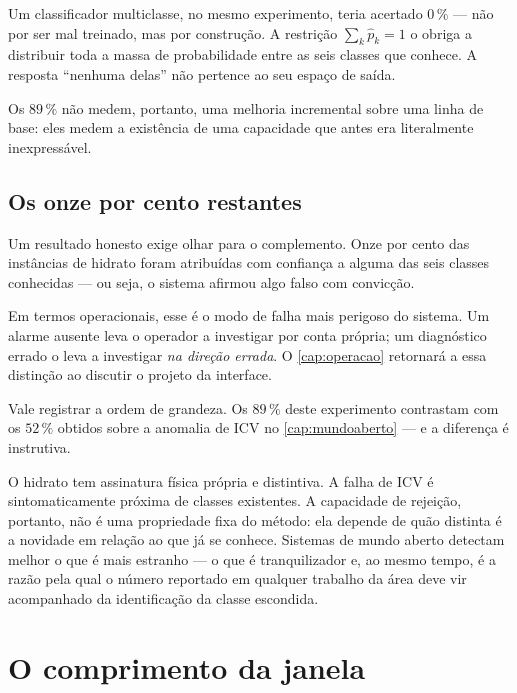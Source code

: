 \begin{destaque}
Um classificador multiclasse, no mesmo experimento, teria acertado $0\,\%$ --- não por
ser mal treinado, mas por construção. A restrição $\sum_k \hat{p}_k = 1$ o obriga a
distribuir toda a massa de probabilidade entre as seis classes que conhece. A resposta
``nenhuma delas'' não pertence ao seu espaço de saída.

Os $89\,\%$ não medem, portanto, uma melhoria incremental sobre uma linha de base: eles
medem a existência de uma capacidade que antes era literalmente inexpressável.
\end{destaque}

\subsection{Os onze por cento restantes}

Um resultado honesto exige olhar para o complemento. Onze por cento das instâncias de
hidrato foram atribuídas com confiança a alguma das seis classes conhecidas --- ou seja,
o sistema afirmou algo falso com convicção.

Em termos operacionais, esse é o modo de falha mais perigoso do sistema. Um alarme
ausente leva o operador a investigar por conta própria; um diagnóstico errado o leva a
investigar \emph{na direção errada}. O \cref{cap:operacao} retornará a essa distinção ao
discutir o projeto da interface.

\begin{destaque}
Vale registrar a ordem de grandeza. Os $89\,\%$ deste experimento contrastam com os
$52\,\%$ obtidos sobre a anomalia de ICV no \cref{cap:mundoaberto} --- e a diferença é
instrutiva.

O hidrato tem assinatura física própria e distintiva. A falha de ICV é sintomaticamente
próxima de classes existentes. A capacidade de rejeição, portanto, não é uma propriedade
fixa do método: ela depende de quão distinta é a novidade em relação ao que já se
conhece. Sistemas de mundo aberto detectam melhor o que é mais estranho --- o que é
tranquilizador e, ao mesmo tempo, é a razão pela qual o número reportado em qualquer
trabalho da área deve vir acompanhado da identificação da classe escondida.
\end{destaque}

\section{O comprimento da janela}

